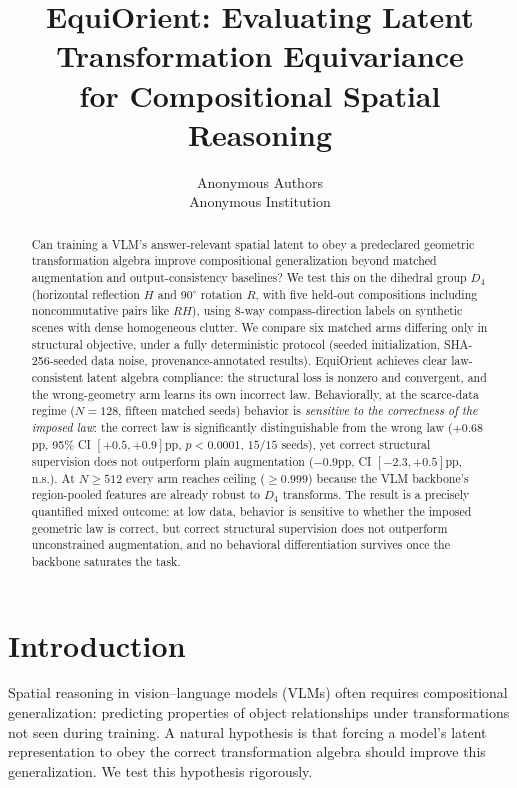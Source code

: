 \documentclass[10pt,twocolumn,letterpaper]{article}
\title{EquiOrient: Evaluating Latent Transformation Equivariance\\for Compositional Spatial Reasoning}
\author{Anonymous Authors\\
Anonymous Institution}
\begin{document}
\maketitle

\begin{abstract}
Can training a VLM's answer-relevant spatial latent to obey a
predeclared geometric transformation algebra improve compositional
generalization beyond matched augmentation and output-consistency
baselines? We test this on the dihedral group $D_4$ (horizontal
reflection $H$ and 90$^\circ$ rotation $R$, with five held-out
compositions including noncommutative pairs like $RH$), using 8-way
compass-direction labels on synthetic scenes with dense homogeneous
clutter. We compare six matched arms differing only in structural
objective, under a fully deterministic protocol (seeded initialization,
SHA-256-seeded data noise, provenance-annotated results). EquiOrient
achieves clear law-consistent latent algebra compliance: the structural
loss is nonzero and convergent, and the wrong-geometry arm learns its
own incorrect law. Behaviorally, at the scarce-data regime ($N{=}128$,
fifteen matched seeds) behavior is \emph{sensitive to the correctness
of the imposed law}: the correct law is significantly distinguishable
from the wrong law ($+0.68$pp, 95\% CI $[+0.5, +0.9]$pp, $p<0.0001$,
$15/15$ seeds), yet correct structural supervision does not outperform
plain augmentation ($-0.9$pp, CI $[-2.3, +0.5]$pp, n.s.). At
$N \geq 512$ every arm reaches ceiling ($\geq 0.999$) because the VLM
backbone's region-pooled features are already robust to $D_4$
transforms. The result is a precisely quantified mixed outcome:
at low data, behavior is sensitive to whether the imposed geometric
law is correct, but correct structural supervision does not outperform
unconstrained augmentation, and no behavioral differentiation survives
once the backbone saturates the task.
\end{abstract}

\section{Introduction}
\label{sec:intro}

Spatial reasoning in vision--language models (VLMs) often requires
compositional generalization: predicting properties of object
relationships under transformations not seen during training. A natural
hypothesis is that forcing a model's latent representation to obey the
correct transformation algebra should improve this generalization. We
test this hypothesis rigorously.
\end{document}
